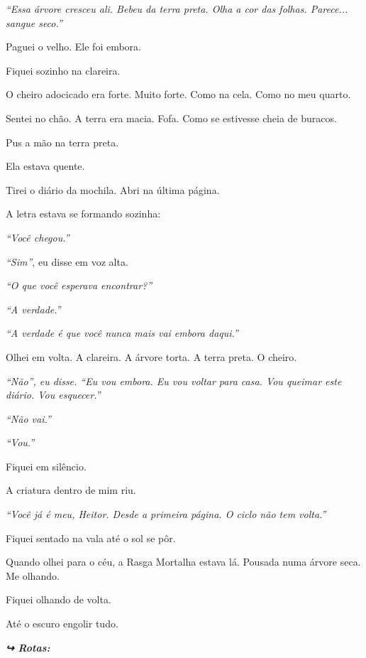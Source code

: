 \noindent \textit{\textquotedblleft{}Essa árvore cresceu ali. Bebeu da terra preta. Olha a cor das folhas. Parece... sangue seco.\textquotedblright{}}

\noindent Paguei o velho. Ele foi embora.

\noindent Fiquei sozinho na clareira.

\noindent O cheiro adocicado era forte. Muito forte. Como na cela. Como no meu quarto.

\noindent Sentei no chão. A terra era macia. Fofa. Como se estivesse cheia de buracos.

\noindent Pus a mão na terra preta.

\noindent Ela estava quente.

\noindent Tirei o diário da mochila. Abri na última página.

\noindent A letra estava se formando sozinha:

\noindent \textit{\textquotedblleft{}Você chegou.\textquotedblright{}}

\noindent \textit{\textquotedblleft{}Sim\textquotedblright{}}, eu disse em voz alta.

\noindent \textit{\textquotedblleft{}O que você esperava encontrar?\textquotedblright{}}

\noindent \textit{\textquotedblleft{}A verdade.\textquotedblright{}}

\noindent \textit{\textquotedblleft{}A verdade é que você nunca mais vai embora daqui.\textquotedblright{}}

\noindent Olhei em volta. A clareira. A árvore torta. A terra preta. O cheiro.

\noindent \textit{\textquotedblleft{}Não\textquotedblright{}\textit{, eu disse. }\textquotedblleft{}Eu vou embora. Eu vou voltar para casa. Vou queimar este diário. Vou esquecer.\textquotedblright{}}

\noindent \textit{\textquotedblleft{}Não vai.\textquotedblright{}}

\noindent \textit{\textquotedblleft{}Vou.\textquotedblright{}}

\noindent Fiquei em silêncio.

\noindent A criatura dentro de mim riu.

\noindent \textit{\textquotedblleft{}Você já é meu, Heitor. Desde a primeira página. O ciclo não tem volta.\textquotedblright{}}

\noindent Fiquei sentado na vala até o sol se pôr.

\noindent Quando olhei para o céu, a Rasga Mortalha estava lá. Pousada numa árvore seca. Me olhando.

\noindent Fiquei olhando de volta.

\noindent Até o escuro engolir tudo.

\vspace{0.5em}
\noindent\textit{\textbf{↪ Rotas:}  \rotasep {}}